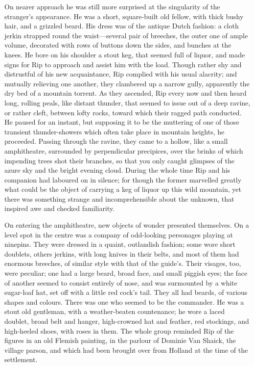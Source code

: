 On nearer approach he was still more surprised at the singularity of the stranger’s appearance. He was a short, square-built old fellow, with thick bushy hair, and a grizzled beard. His dress was of the antique Dutch fashion: a cloth jerkin strapped round the waist—several pair of breeches, the outer one of ample volume, decorated with rows of buttons down the sides, and bunches at the knees. He bore on his shoulder a stout keg, that seemed full of liquor, and made signs for Rip to approach and assist him with the load. Though rather shy and distrustful of his new acquaintance, Rip complied with his usual alacrity; and mutually relieving one another, they clambered up a narrow gully, apparently the dry bed of a mountain torrent. As they ascended, Rip every now and then heard long, rolling peals, like distant thunder, that seemed to issue out of a deep ravine, or rather cleft, between lofty rocks, toward which their ragged path conducted. He paused for an instant, but supposing it to be the muttering of one of those transient thunder-showers which often take place in mountain heights, he proceeded. Passing through the ravine, they came to a hollow, like a small amphitheatre, surrounded by perpendicular precipices, over the brinks of which impending trees shot their branches, so that you only caught glimpses of the azure sky and the bright evening cloud. During the whole time Rip and his companion had laboured on in silence; for though the former marvelled greatly what could be the object of carrying a keg of liquor up this wild mountain, yet there was something strange and incomprehensible about the unknown, that inspired awe and checked familiarity.

On entering the amphitheatre, new objects of wonder presented themselves. On a level spot in the centre was a company of odd-looking personages playing at ninepins. They were dressed in a quaint, outlandish fashion; some wore short doublets, others jerkins, with long knives in their belts, and most of them had enormous breeches, of similar style with that of the guide’s. Their visages, too, were peculiar; one had a large beard, broad face, and small piggish eyes; the face of another seemed to consist entirely of nose, and was surmounted by a white sugar-loaf hat, set off with a little red cock’s tail. They all had beards, of various shapes and colours. There was one who seemed to be the commander. He was a stout old gentleman, with a weather-beaten countenance; he wore a laced doublet, broad belt and hanger, high-crowned hat and feather, red stockings, and high-heeled shoes, with roses in them. The whole group reminded Rip of the figures in an old Flemish painting, in the parlour of Dominie Van Shaick, the village parson, and which had been brought over from Holland at the time of the settlement.

